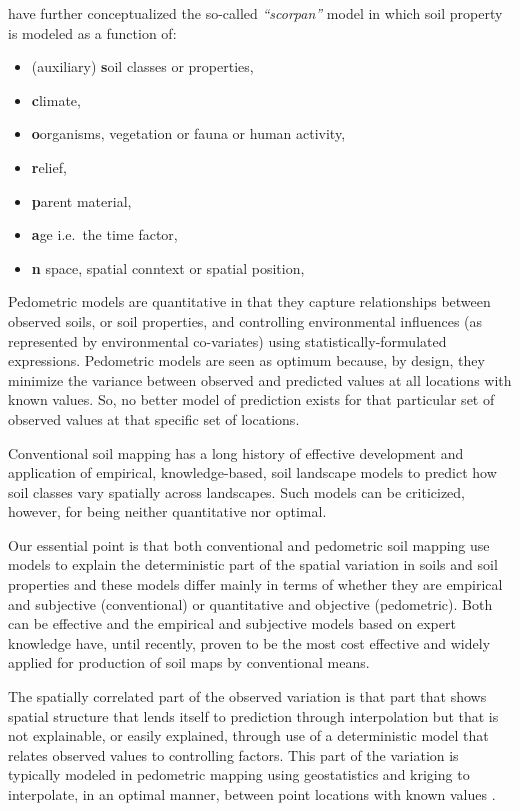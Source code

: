 \documentclass[11pt]{krantz}
\theoremstyle{definition}
\theoremstyle{definition}
\theoremstyle{definition}
\theoremstyle{remark}
\begin{document}
\citet{MCBRATNEY20033} have further conceptualized the so-called
\emph{``scorpan''} model in which soil property is modeled as a function
of:

\begin{itemize}
\item
  (auxiliary) \textbf{s}oil classes or properties,
\item
  \textbf{c}limate,
\item
  \textbf{o}organisms, vegetation or fauna or human activity,
\item
  \textbf{r}elief,
\item
  \textbf{p}arent material,
\item
  \textbf{a}ge i.e.~the time factor,
\item
  \textbf{n} space, spatial conntext or spatial position,
\end{itemize}

Pedometric models are quantitative in that they capture relationships
between observed soils, or soil properties, and controlling
environmental influences (as represented by environmental co-variates)
using statistically-formulated expressions. Pedometric models are seen
as optimum because, by design, they minimize the variance between
observed and predicted values at all locations with known values. So, no
better model of prediction exists for that particular set of observed
values at that specific set of locations.

Conventional soil mapping has a long history of effective development
and application of empirical, knowledge-based, soil landscape models to
predict how soil classes vary spatially across landscapes. Such models
can be criticized, however, for being neither quantitative nor optimal.

Our essential point is that both conventional and pedometric soil
mapping use models to explain the deterministic part of the spatial
variation in soils and soil properties and these models differ mainly in
terms of whether they are empirical and subjective (conventional) or
quantitative and objective (pedometric). Both can be effective and the
empirical and subjective models based on expert knowledge have, until
recently, proven to be the most cost effective and widely applied for
production of soil maps by conventional means.

The spatially correlated part of the observed variation is that part
that shows spatial structure that lends itself to prediction through
interpolation but that is not explainable, or easily explained, through
use of a deterministic model that relates observed values to controlling
factors. This part of the variation is typically modeled in pedometric
mapping using geostatistics and kriging to interpolate, in an optimal
manner, between point locations with known values
\citep{goovaerts2001geostatistical, McBratney2003Geoderma}.
\end{document}
